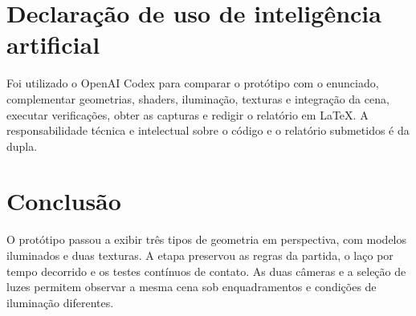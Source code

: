 \documentclass[12pt,a4paper]{article}
\begin{document}
\section{Declaração de uso de inteligência artificial}

Foi utilizado o OpenAI Codex para comparar o protótipo com o enunciado, complementar geometrias, shaders, iluminação, texturas e integração da cena, executar verificações, obter as capturas e redigir o relatório em LaTeX. A responsabilidade técnica e intelectual sobre o código e o relatório submetidos é da dupla.

\section{Conclusão}

O protótipo passou a exibir três tipos de geometria em perspectiva, com modelos iluminados e duas texturas. A etapa preservou as regras da partida, o laço por tempo decorrido e os testes contínuos de contato. As duas câmeras e a seleção de luzes permitem observar a mesma cena sob enquadramentos e condições de iluminação diferentes.
\end{document}
